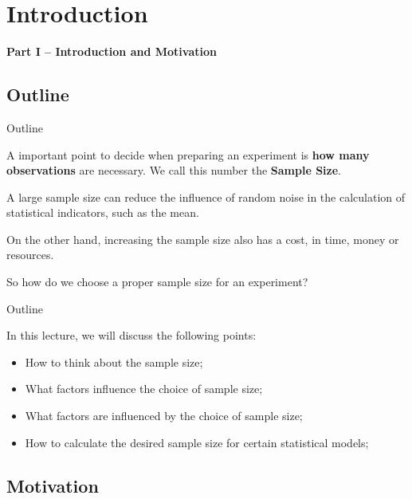 \section{Introduction}

\begin{frame}{}
  \begin{center}
    {\bf Part I -- Introduction and Motivation}
  \end{center}
\end{frame}

\subsection{Outline}

\begin{frame}{Outline}

  A important point to decide when preparing an experiment is {\bf how
    many observations} are necessary. We call this number the {\bf Sample Size}.\bigskip

  A large sample size can reduce the influence of random noise in the
  calculation of statistical indicators, such as the mean.\bigskip
  
  On the other hand, increasing the sample size also has a cost, in
  time, money or resources.\bigskip

  So how do we choose a proper sample size for an experiment?
\end{frame}

\begin{frame}{Outline}

  In this lecture, we will discuss the following points:\bigskip

  \begin{itemize}
  \item How to think about the sample size;
  \item What factors influence the choice of sample size;
  \item What factors are influenced by the choice of sample size;
  \item How to calculate the desired sample size for certain
    statistical models;
  \end{itemize}

\end{frame}


\subsection{Motivation}

